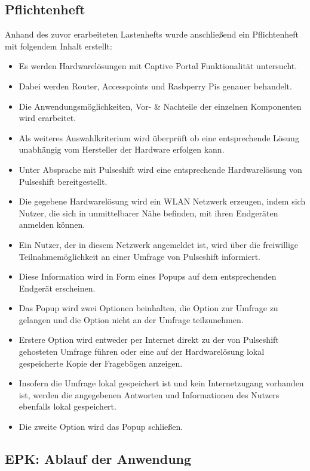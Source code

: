 \subsection{Pflichtenheft}
Anhand des zuvor erarbeiteten Lastenhefts wurde anschließend ein Pflichtenheft mit folgendem Inhalt erstellt:
\begin{itemize}
\item Es werden Hardwarelösungen mit Captive Portal Funktionalität untersucht.
\item Dabei werden Router, Accesspoints und Rasbperry Pis genauer behandelt.
\item Die Anwendungsmöglichkeiten, Vor- & Nachteile der einzelnen Komponenten wird erarbeitet.
\item Als weiteres Auswahlkriterium wird überprüft ob eine entsprechende Lösung unabhängig vom Hersteller der Hardware erfolgen kann.
\item Unter Absprache mit Pulseshift wird eine entsprechende Hardwarelösung von Pulseshift bereitgestellt.
\item Die gegebene Hardwarelösung wird ein WLAN Netzwerk erzeugen, indem sich Nutzer, die sich in unmittelbarer Nähe befinden, mit ihren Endgeräten anmelden können.
\item Ein Nutzer, der in diesem Netzwerk angemeldet ist, wird über die freiwillige Teilnahmemöglichkeit an einer Umfrage von Pulseshift informiert.
\item Diese Information wird in Form eines Popups auf dem entsprechenden Endgerät erscheinen.
\item Das Popup wird zwei Optionen beinhalten, die Option zur Umfrage zu gelangen und die Option nicht an der Umfrage teilzunehmen.
\item Erstere Option wird entweder per Internet direkt zu der von Pulseshift gehosteten Umfrage führen oder eine auf der Hardwarelösung lokal gespeicherte Kopie der Fragebögen anzeigen.
\item Insofern die Umfrage lokal gespeichert ist und kein Internetzugang vorhanden ist, werden die angegebenen Antworten und Informationen des Nutzers ebenfalls lokal gespeichert.
\item Die zweite Option wird das Popup schließen.
\end{itemize}

\subsection{EPK: Ablauf der Anwendung}

